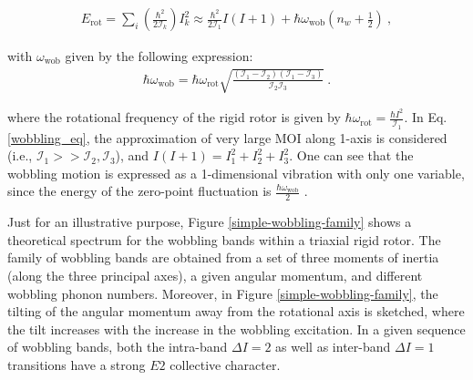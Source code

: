 \documentclass[11pt]{article}
\begin{document}
\begin{align}
    E_\text{rot}=\sum_i\left(\frac{\hbar^2}{2\mathcal{I}_k}\right)I^2_k\approx\frac{\hbar^2}{2\mathcal{I}_1}I(I+1)+\hbar\omega_\text{wob}\left(n_w+\frac{1}{2}\right)\ , \label{wobbling_eq}
\end{align}

with $\omega_\text{wob}$ given by the following expression:
\begin{align}
    \hbar\omega_\text{wob}=\hbar\omega_\text{rot}\sqrt{\frac{(\mathcal{I}_1-\mathcal{I}_2)(\mathcal{I}_1-\mathcal{I}_3)}{\mathcal{I}_2\mathcal{I}_3}}\ .
\end{align}

where the rotational frequency of the rigid rotor is given by $\hbar\omega_\text{rot}=\frac{\hbar I^2}{\mathcal{I}_1}$. In Eq. \ref{wobbling_eq}, the approximation of very large MOI along 1-axis is considered (i.e., $\mathcal{I}_1>>\mathcal{I}_2,\mathcal{I}_3$), and $I(I+1)=I_1^2+I_2^2+I_3^2$. One can see that the wobbling motion is expressed as a 1-dimensional vibration with only one variable, since the energy of the zero-point fluctuation is $\frac{\hbar\omega_\text{wob}}{2}$ \cite{hagemann2003quantized}.

Just for an illustrative purpose, Figure \ref{simple-wobbling-family} shows a theoretical spectrum for the wobbling bands within a triaxial rigid rotor. The family of wobbling bands are obtained from a set of three moments of inertia (along the three principal axes), a given angular momentum, and different wobbling phonon numbers. Moreover, in Figure \ref{simple-wobbling-family}, the tilting of the angular momentum away from the rotational axis is sketched, where the tilt increases with the increase in the wobbling excitation. In a given sequence of wobbling bands, both the intra-band $\Delta I=2$ as well as inter-band $\Delta I=1$ transitions have a strong $E2$ collective character.
\end{document}

